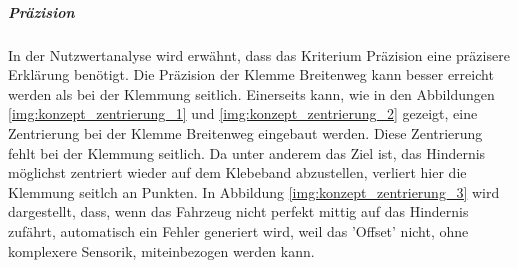 \documentclass[../main.tex]{subfiles}
\begin{document}
        \newpage
            
            \subparagraph{Präzision}

            In der Nutzwertanalyse wird erwähnt, dass das Kriterium Präzision eine präzisere Erklärung benötigt. Die Präzision der Klemme Breitenweg kann besser erreicht werden als bei der Klemmung seitlich. Einerseits kann, wie in den Abbildungen \ref{img:konzept_zentrierung_1} und \ref{img:konzept_zentrierung_2} gezeigt, eine Zentrierung bei der Klemme Breitenweg eingebaut werden. Diese Zentrierung fehlt bei der Klemmung seitlich. Da unter anderem das Ziel ist, das Hindernis möglichst zentriert wieder auf dem Klebeband abzustellen, verliert hier die Klemmung seitlch an Punkten. In Abbildung \ref{img:konzept_zentrierung_3} wird dargestellt, dass, wenn das Fahrzeug nicht perfekt mittig auf das Hindernis zufährt, automatisch ein Fehler generiert wird, weil das 'Offset' nicht, ohne komplexere Sensorik, miteinbezogen werden kann.
\end{document}
